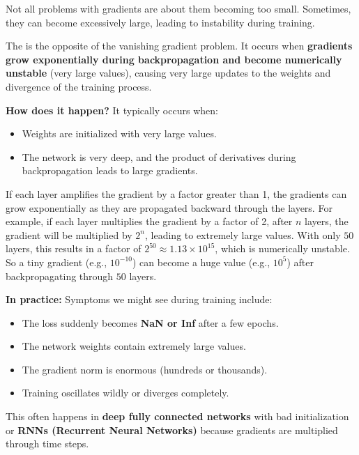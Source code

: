 \highspace
\begin{deepeningbox}
    Not all problems with gradients are about them becoming too small. Sometimes, they can become excessively large, leading to instability during training.

    The  is the opposite of the vanishing gradient problem. It occurs when \textbf{gradients grow exponentially during backpropagation and become numerically unstable} (very large values), causing very large updates to the weights and divergence of the training process.

    \highspace
    \textcolor{Green3}{ \textbf{How does it happen?}} It typically occurs when:
    \begin{itemize}
        \item Weights are initialized with very large values.
        \item The network is very deep, and the product of derivatives during backpropagation leads to large gradients.
    \end{itemize}
    If each layer amplifies the gradient by a factor greater than 1, the gradients can grow exponentially as they are propagated backward through the layers. For example, if each layer multiplies the gradient by a factor of 2, after $n$ layers, the gradient will be multiplied by $2^n$, leading to extremely large values. With only $50$ layers, this results in a factor of $2^{50} \approx 1.13 \times 10^{15}$, which is numerically unstable. So a tiny gradient (e.g., $10^{-10}$) can become a huge value (e.g., $10^{5}$) after backpropagating through $50$ layers.

    \highspace
    \textcolor{Red2}{ \textbf{In practice:}} Symptoms we might see during training include:
    \begin{itemize}
        \item The loss suddenly becomes \textbf{NaN or Inf} after a few epochs.
        \item The network weights contain extremely large values.
        \item The gradient norm is enormous (hundreds or thousands).
        \item Training oscillates wildly or diverges completely.
    \end{itemize}
    This often happens in \textbf{deep fully connected networks} with bad initialization or \textbf{RNNs (Recurrent Neural Networks)} because gradients are multiplied through time steps.


\end{deepeningbox}
